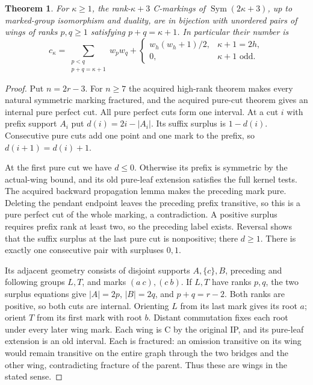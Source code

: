 \documentclass[11pt,a4paper]{article}
\newtheorem{theorem}{Theorem}\newtheorem{lemma}[theorem]{Lemma}
\newcommand{\Sym}{\operatorname{Sym}}\newcommand{\gen}[1]{\langle#1\rangle}
\begin{document}
\begin{theorem}\label{balanced}
For $\kappa\ge1$, the rank-$\kappa+3$ C-markings of
$\Sym(2\kappa+3)$, up to marked-group isomorphism and duality,
are in bijection with unordered pairs of wings of ranks $p,q\ge1$
satisfying $p+q=\kappa+1$. In particular their number is
\[
 c_\kappa=\sum_{\substack{p<q\\p+q=\kappa+1}}w_pw_q+
 \begin{cases}w_h(w_h+1)/2,&\kappa+1=2h,\\0,&\kappa+1\text{ odd}.
 \end{cases}                                                   \tag{1}
\]
\end{theorem}
\begin{proof}
Put $n=2r-3$. For $n\ge7$ the acquired high-rank theorem makes every
natural symmetric marking fractured, and the acquired pure-cut theorem
gives an internal pure perfect cut. All pure perfect cuts form one
interval. At a cut $i$ with prefix support $A_i$ put
$d(i)=2i-|A_i|$. Its suffix surplus is $1-d(i)$. Consecutive pure
cuts add one point and one mark to the prefix, so
$d(i+1)=d(i)+1$.

At the first pure cut we have $d\le0$. Otherwise its prefix is
symmetric by the actual-wing bound, and its old pure-leaf extension
satisfies the full kernel tests. The acquired backward propagation
lemma makes the preceding mark pure. Deleting the pendant endpoint
leaves the preceding prefix transitive, so this is a pure perfect cut
of the whole marking, a contradiction. A positive surplus requires
prefix rank at least two, so the preceding label exists. Reversal
shows that the suffix surplus at the last pure cut is nonpositive;
there $d\ge1$. There is exactly one consecutive pair with surpluses
$0,1$.

Its adjacent geometry consists of disjoint supports $A,\{c\},B$,
preceding and following groups $L,T$, and marks $(a\ c),(c\ b)$.
If $L,T$ have ranks $p,q$, the two surplus equations give
$|A|=2p$, $|B|=2q$, and $p+q=r-2$. Both ranks are positive,
so both cuts are internal. Orienting $L$ from its last mark gives
its root $a$; orient $T$ from its first mark with root $b$.
Distant commutation fixes each root under every later wing mark.
Each wing is C by the original IP, and its pure-leaf extension is
an old interval. Each is fractured: an omission transitive on its
wing would remain transitive on the entire graph through the two
bridges and the other wing, contradicting fracture of the parent.
Thus these are wings in the stated sense.


\end{proof}
\end{document}
